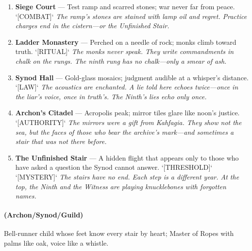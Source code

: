 \begin{enumerate}
\item \textbf{Siege Court} --- Test ramp and scarred stones; war never far from peace. `[COMBAT]`
  \hfill \textit{The ramp's stones are stained with lamp oil and regret. Practice charges end in the cistern---or the Unfinished Stair.}
\item[J] \textbf{Ladder Monastery} --- Perched on a needle of rock; monks climb toward truth. `[RITUAL]`
  \hfill \textit{The monks never speak. They write commandments in chalk on the rungs. The ninth rung has no chalk---only a smear of ash.}
\item[Q] \textbf{Synod Hall} --- Gold-glass mosaics; judgment audible at a whisper's distance. `[LAW]`
  \hfill \textit{The acoustics are enchanted. A lie told here echoes twice---once in the liar's voice, once in truth's. The Ninth's lies echo only once.}
\item[K] \textbf{Archon's Citadel} --- Acropolis peak; mirror tiles glare like noon's justice. `[AUTHORITY]`
  \hfill \textit{The mirrors were a gift from Kahfagia. They show not the sea, but the faces of those who bear the archive's mark---and sometimes a stair that was not there before.}
\item[A] \textbf{The Unfinished Stair} --- A hidden flight that appears only to those who have asked a question the Synod cannot answer. `[THRESHOLD]` `[MYSTERY]`
  \hfill \textit{The stairs have no end. Each step is a different year. At the top, the Ninth and the Witness are playing knucklebones with forgotten names.}
\end{enumerate}

\paragraph*{(Archon/Synod/Guild)} Bell-runner child whose feet know every stair by heart; Master of Ropes with palms like oak, voice like a whistle.

